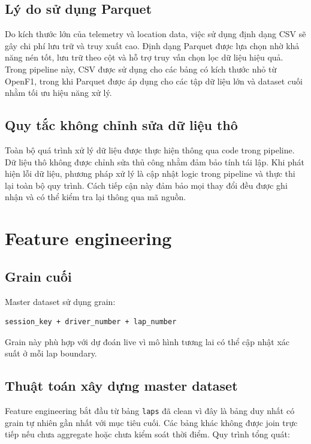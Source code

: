 \documentclass[conference]{IEEEtran}
\begin{document}
\subsection{Lý do sử dụng Parquet}

Do kích thước lớn của telemetry và location data, việc sử dụng định dạng CSV sẽ gây chi phí lưu trữ và truy xuất cao. Định dạng Parquet được lựa chọn nhờ khả năng nén tốt, lưu trữ theo cột và hỗ trợ truy vấn chọn lọc dữ liệu hiệu quả. Trong pipeline này, CSV được sử dụng cho các bảng có kích thước nhỏ từ OpenF1, trong khi Parquet được áp dụng cho các tập dữ liệu lớn và dataset cuối nhằm tối ưu hiệu năng xử lý.

\subsection{Quy tắc không chỉnh sửa dữ liệu thô}

Toàn bộ quá trình xử lý dữ liệu được thực hiện thông qua code trong pipeline. Dữ liệu thô không được chỉnh sửa thủ công nhằm đảm bảo tính tái lập. Khi phát hiện lỗi dữ liệu, phương pháp xử lý là cập nhật logic trong pipeline và thực thi lại toàn bộ quy trình. Cách tiếp cận này đảm bảo mọi thay đổi đều được ghi nhận và có thể kiểm tra lại thông qua mã nguồn.

\section{Feature engineering}
\subsection{Grain cuối}
Master dataset sử dụng grain:

\begin{lstlisting}
session_key + driver_number + lap_number
\end{lstlisting}

Grain này phù hợp với dự đoán live vì mô hình tương lai có thể cập nhật xác suất ở mỗi lap boundary.

\subsection{Thuật toán xây dựng master dataset}
Feature engineering bắt đầu từ bảng \texttt{laps} đã clean vì đây là bảng duy nhất có grain tự nhiên gần nhất với mục tiêu cuối. Các bảng khác không được join trực tiếp nếu chưa aggregate hoặc chưa kiểm soát thời điểm. Quy trình tổng quát:
\end{document}
